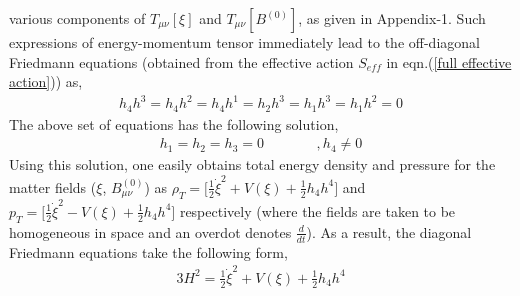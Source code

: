 \documentclass[a4paper]{article}
\begin{document}
various components of $T_{\mu\nu}[\xi]$ and $T_{\mu\nu}[B^{(0)}]$, as given in Appendix-1. Such expressions of energy-momentum 
tensor immediately lead to the off-diagonal Friedmann equations (obtained from the effective action $S_{eff}$ in eqn.(\ref{full effective action})) as,
\begin{eqnarray}
 h_4h^3 = h_4h^2 = h_4h^1 = h_2h^3 = h_1h^3 = h_1h^2 = 0
 \label{off einstein equation}
\end{eqnarray}
The above set of equations has the following solution,
\begin{eqnarray}
 h_1 = h_2 = h_3 = 0~~~~~~~~~~~~~~~~~, h_4 \neq 0
 \label{sol off einstein equation}
\end{eqnarray}
Using this solution, one easily obtains total energy density and pressure for the matter fields ($\xi$, $B_{\mu\nu}^{(0)}$) as 
$\rho_T = \bigg[\frac{1}{2}\dot{\xi}^2 + V(\xi) + \frac{1}{2}h_4h^4\bigg]$ and 
$p_T = \bigg[\frac{1}{2}\dot{\xi}^2 - V(\xi) + \frac{1}{2}h_4h^4\bigg]$ respectively (where the fields are taken to be homogeneous in space and an 
overdot denotes $\frac{d}{dt}$). As a result, the diagonal Friedmann equations take the following form,
\begin{eqnarray}
 3H^2 = \frac{1}{2}\dot{\xi}^2 + V(\xi) + \frac{1}{2}h_4h^4
 \label{einstein equation1}
\end{eqnarray}
\end{document}
